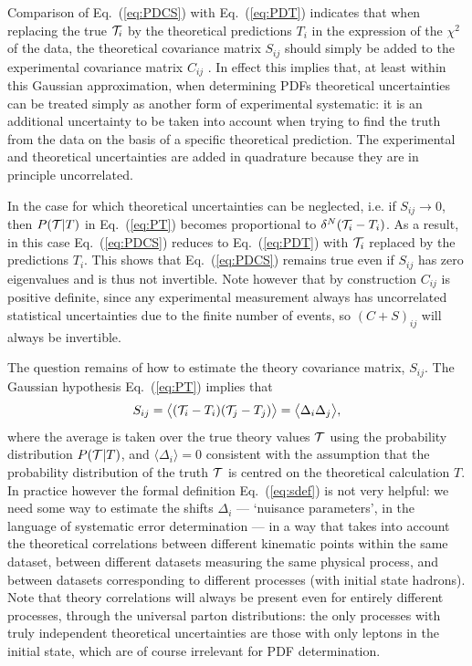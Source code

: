 Comparison of Eq.~(\ref{eq:PDCS}) with Eq.~(\ref{eq:PDT}) indicates that
when replacing the true ${\cal T}_i$ by the theoretical predictions
$T_i$ in the expression of the  $\chi^2$ of the data, the
theoretical covariance matrix $S_{ij}$ should simply be added
to the experimental covariance matrix $C_{ij}$ \cite{Ball:2018odr}.
%
In effect this implies that, at least within this
Gaussian approximation, when determining PDFs theoretical uncertainties 
can be treated simply as
another form of experimental systematic: it is an additional
uncertainty to be taken into account when trying to find the truth
from the data on the basis of a specific theoretical prediction.
%
The experimental and theoretical uncertainties are added in quadrature
because they are in principle uncorrelated. 

In the case for which theoretical uncertainties can be neglected, 
i.e. if $S_{ij}\to0$,
then $P({\cal T}|T)$ in Eq.~(\ref{eq:PT}) becomes proportional
to $\delta^N({\cal T}_i-T_i)$.
%
As  a result, in this case Eq.~(\ref{eq:PDCS}) reduces
 to Eq.~(\ref{eq:PDT}) with ${\cal T}_i$ replaced by the
predictions $T_i$. This shows that Eq.~(\ref{eq:PDCS})
remains true even if $S_{ij}$ has zero eigenvalues and is thus not
invertible.
%
Note however
that by construction $C_{ij}$ is positive definite, since any
experimental measurement always
has uncorrelated statistical uncertainties due to the finite number of events,
so $(C+S)_{ij}$ will always be invertible. 
 
The question remains of how to estimate the theory covariance matrix,
$S_{ij}$.
%
The Gaussian hypothesis Eq.~(\ref{eq:PT}) implies that
\begin{equation}
            S_{ij} = \big\langle({\cal T}_i - T_i)({\cal T}_j - T_j)\big\rangle=\big\langle\Delta_i\Delta_j\big\rangle,\label{eq:sdef}
      \end{equation}
where the average is taken over the true theory values ${\cal T}$ using the probability
distribution $P({\cal T}|T)$, and 
$\langle\Delta_i\rangle=0$ consistent with the assumption that the probability 
distribution of the truth ${\cal T}$ is centred on the theoretical calculation $T$.
%
In practice however the formal definition
Eq.~(\ref{eq:sdef}) is not very helpful: we need some way to
estimate the shifts $\Delta_i$ --- `nuisance parameters', in the
language of systematic error determination --- in a way that takes into
account the theoretical correlations between different kinematic points
within the same dataset, between different datasets measuring
the same physical process, and between datasets corresponding to different
processes (with initial state hadrons).
%
Note that theory correlations will always be present even for entirely 
different processes, through the universal parton distributions: the only processes with truly independent theoretical uncertainties are those with only leptons in the initial state, which are of course irrelevant for PDF determination.

